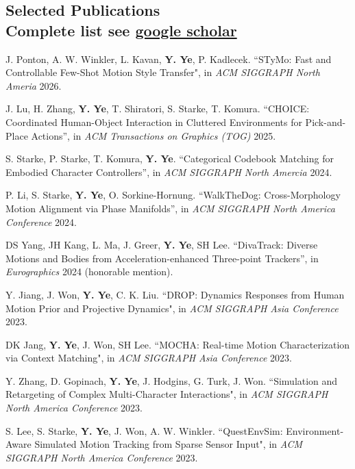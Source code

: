 \documentclass[margin,line]{res}
\begin{document}
\begin{resume}
\section{\sc Selected Publications \\ \vspace*{.1in} Complete list see \href{https://scholar.google.com/citations?user=Zxb8sdkAAAAJ}{google scholar}}

J. Ponton, A. W. Winkler, L. Kavan, {\bf Y. Ye}, P. Kadlecek. ``STyMo: Fast and Controllable Few-Shot Motion Style Transfer", in {\em ACM SIGGRAPH North Ameria} 2026.

\vspace*{-.1in}
J. Lu, H. Zhang, {\bf Y. Ye}, T. Shiratori, S. Starke, T. Komura. ``CHOICE: Coordinated Human-Object Interaction in Cluttered Environments for Pick-and-Place Actions'', in {\em ACM Transactions on Graphics (TOG)} 2025.

\vspace*{-.1in}
S. Starke, P. Starke, T. Komura, {\bf Y. Ye}. ``Categorical Codebook Matching for Embodied Character Controllers'', in {\em ACM SIGGRAPH North Amercia} 2024.

\vspace*{-.1in}
P. Li, S. Starke, {\bf Y. Ye}, O. Sorkine-Hornung. ``WalkTheDog: Cross-Morphology Motion Alignment via Phase Manifolds'', in {\em ACM SIGGRAPH North America Conference} 2024.

\vspace*{-.1in}
DS Yang, JH Kang, L. Ma, J. Greer, {\bf Y. Ye}, SH Lee. ``DivaTrack: Diverse Motions and Bodies from Acceleration-enhanced Three-point Trackers'', in {\em Eurographics} 2024 (honorable mention). 

\vspace*{-.1in}
Y. Jiang, J. Won, {\bf Y. Ye}, C. K. Liu. ``DROP: Dynamics Responses from Human Motion Prior and Projective Dynamics", in {\em ACM SIGGRAPH Asia Conference} 2023.

\vspace*{-.1in}
DK Jang, {\bf Y. Ye}, J. Won, SH Lee. ``MOCHA: Real-time Motion Characterization via Context Matching", in {\em ACM SIGGRAPH Asia Conference} 2023.

\vspace*{-.1in}
Y. Zhang, D. Gopinach, {\bf Y. Ye}, J. Hodgins, G. Turk, J. Won. ``Simulation and Retargeting of Complex Multi-Character Interactions", in {\em ACM SIGGRAPH North America Conference} 2023.

\vspace*{-.1in}
S. Lee, S. Starke, {\bf Y. Ye}, J. Won, A. W. Winkler. ``QuestEnvSim: Environment-Aware Simulated Motion Tracking from Sparse Sensor Input", in {\em ACM SIGGRAPH North America Conference} 2023.


\end{resume}
\end{document}
